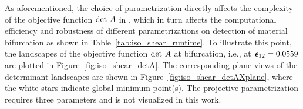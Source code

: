 \documentclass[12pt]{article}
\numberwithin{equation}{section}
\begin{document}
As aforementioned, the choice of parametrization directly affects the
complexity of the objective function ${\rm det}~A$ in
, which in turn affects the
computational efficiency and robustness of different parametrizations
on detection of material bifurcation as shown in
Table~\ref{tab:iso_shear_runtime}. To illustrate this point, the
landscapes of the objective function ${\rm det}~A$ at bifurcation,
i.e., at ${\boldsymbol{\epsilon}}_{12}=0.0559$ are plotted in
Figure~\ref{fig:iso_shear_detA}. The corresponding plane views of the
determinant landscapes are shown in
Figure~\ref{fig:iso_shear_detAXplane}, where the white stars indicate
global minimum point(s). The projective parametrization requires three parameters and is not visualized in this work.

\begin{figure}[H]
   \centering {}  
\end{figure}
\end{document}
